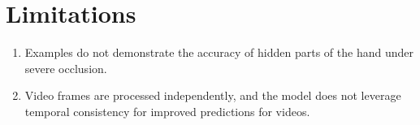 \documentclass{article}
\begin{document}
\section*{Limitations}

\begin{enumerate}
    \item Examples do not demonstrate the accuracy of hidden parts of the hand under severe occlusion.
    \item Video frames are processed independently, and the model does not leverage temporal consistency for improved predictions for videos.
\end{enumerate}
\end{document}
